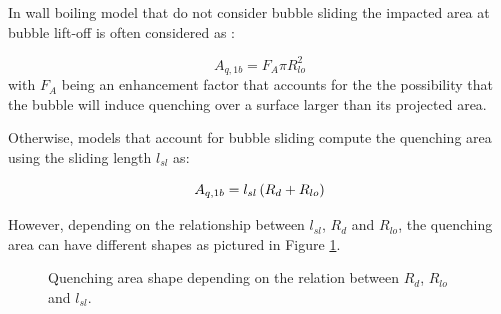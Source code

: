 In wall boiling model that do not consider bubble sliding \cite{kurul_multidimensional_1990, guelfi_neptune_2007, podowski_mechanistic_2008} the impacted area at bubble lift-off is often considered as :

\begin{equation}
A_{q,1b} = F_{A} \pi R_{lo}^{2}
\end{equation} 
with $F_{A}$ being an enhancement factor that accounts for the the possibility that the bubble will induce quenching over a surface larger than its projected area.

\npar

Otherwise, models that account for bubble sliding \cite{basu_wall_2005, yeoh_fundamental_2008, gilman_self-consistent_2017, kommajosyula_development_2020} compute the quenching area using the sliding length $l_{sl}$ as:

\begin{equation}
A_{q,1b} = l_{sl}\left( R_{d} + R_{lo} \right)
\end{equation}

However, depending on the relationship between $l_{sl}$, $R_{d}$ and $R_{lo}$, the quenching area can have different shapes as pictured in Figure \ref{fig:slide_area}.


\begin{figure}[!h]
\centering
{}
\hfill
{}
\hfill
{}
\caption{Quenching area shape depending on the relation between $R_{d}$, $R_{lo}$ and $l_{sl}$.}
\label{fig:slide_area}
\end{figure}


